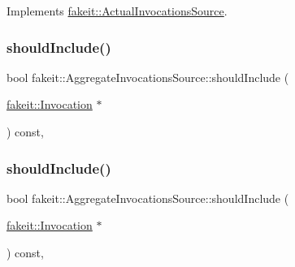 Implements \mbox{\hyperlink{structfakeit_1_1ActualInvocationsSource_a274de522e11e1f9b8d70c6e0be9e5a9b}{fakeit\+::\+Actual\+Invocations\+Source}}.

\mbox{\label{structfakeit_1_1AggregateInvocationsSource_a7e02b97ba9e4b12765d7d46420fab1e7}} 
\subsubsection{\texorpdfstring{shouldInclude()}{shouldInclude()}\hspace{0.1cm}{\footnotesize\ttfamily [1/9]}}
{\footnotesize\ttfamily bool fakeit\+::\+Aggregate\+Invocations\+Source\+::should\+Include (\begin{DoxyParamCaption}\item[{\mbox{\hyperlink{structfakeit_1_1Invocation}{fakeit\+::\+Invocation}} $\ast$}]{ }\end{DoxyParamCaption}) const\hspace{0.3cm}{\ttfamily [inline]}, {\ttfamily [protected]}}

\mbox{\label{structfakeit_1_1AggregateInvocationsSource_a7e02b97ba9e4b12765d7d46420fab1e7}} 
\subsubsection{\texorpdfstring{shouldInclude()}{shouldInclude()}\hspace{0.1cm}{\footnotesize\ttfamily [2/9]}}
{\footnotesize\ttfamily bool fakeit\+::\+Aggregate\+Invocations\+Source\+::should\+Include (\begin{DoxyParamCaption}\item[{\mbox{\hyperlink{structfakeit_1_1Invocation}{fakeit\+::\+Invocation}} $\ast$}]{ }\end{DoxyParamCaption}) const\hspace{0.3cm}{\ttfamily [inline]}, {\ttfamily [protected]}}

